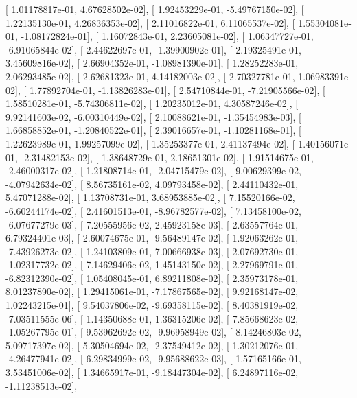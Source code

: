 \documentclass{article}
\begin{document}
       [  1.01178817e-01,   4.67628502e-02],
       [  1.92453229e-01,  -5.49767150e-02],
       [  1.22135130e-01,   4.26836353e-02],
       [  2.11016822e-01,   6.11065537e-02],
       [  1.55304081e-01,  -1.08172824e-01],
       [  1.16072843e-01,   2.23605081e-02],
       [  1.06347727e-01,  -6.91065844e-02],
       [  2.44622697e-01,  -1.39900902e-01],
       [  2.19325491e-01,   3.45609816e-02],
       [  2.66904352e-01,  -1.08981390e-01],
       [  1.28252283e-01,   2.06293485e-02],
       [  2.62681323e-01,   4.14182003e-02],
       [  2.70327781e-01,   1.06983391e-02],
       [  1.77892704e-01,  -1.13826283e-01],
       [  2.54710844e-01,  -7.21905566e-02],
       [  1.58510281e-01,  -5.74306811e-02],
       [  1.20235012e-01,   4.30587246e-02],
       [  9.92141603e-02,  -6.00310449e-02],
       [  2.10088621e-01,  -1.35454983e-03],
       [  1.66858852e-01,  -1.20840522e-01],
       [  2.39016657e-01,  -1.10281168e-01],
       [  1.22623989e-01,   1.99257099e-02],
       [  1.35253377e-01,   2.41137494e-02],
       [  1.40156071e-01,  -2.31482153e-02],
       [  1.38648729e-01,   2.18651301e-02],
       [  1.91514675e-01,  -2.46000317e-02],
       [  1.21808714e-01,  -2.04715479e-02],
       [  9.00629399e-02,  -4.07942634e-02],
       [  8.56735161e-02,   4.09793458e-02],
       [  2.44110432e-01,   5.47071288e-02],
       [  1.13708731e-01,   3.68953885e-02],
       [  7.15520166e-02,  -6.60244174e-02],
       [  2.41601513e-01,  -8.96782577e-02],
       [  7.13458100e-02,  -6.07677279e-03],
       [  7.20555956e-02,   2.45923158e-03],
       [  2.63557764e-01,   6.79324401e-03],
       [  2.60074675e-01,  -9.56489147e-02],
       [  1.92063262e-01,  -7.43926273e-02],
       [  1.24103809e-01,   7.00666938e-03],
       [  2.07692730e-01,  -1.02317732e-02],
       [  7.14629406e-02,   1.45143150e-02],
       [  2.27969791e-01,  -6.82312390e-02],
       [  1.05408045e-01,   6.89211808e-02],
       [  2.35973178e-01,   8.01237890e-02],
       [  1.29415061e-01,  -7.17867565e-02],
       [  9.92168147e-02,   1.02243215e-01],
       [  9.54037806e-02,  -9.69358115e-02],
       [  8.40381919e-02,  -7.03511555e-06],
       [  1.14350688e-01,   1.36315206e-02],
       [  7.85668623e-02,  -1.05267795e-01],
       [  9.53962692e-02,  -9.96958949e-02],
       [  8.14246803e-02,   5.09717397e-02],
       [  5.30504694e-02,  -2.37549412e-02],
       [  1.30212076e-01,  -4.26477941e-02],
       [  6.29834999e-02,  -9.95688622e-03],
       [  1.57165166e-01,   3.53451006e-02],
       [  1.34665917e-01,  -9.18447304e-02],
       [  6.24897116e-02,  -1.11238513e-02],
\end{document}
